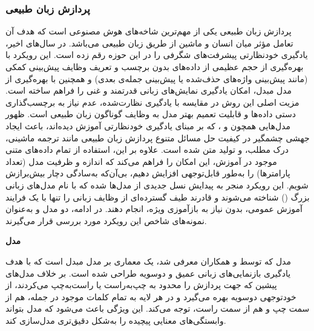 \subsubsection{پردازش زبان طبیعی}
پردازش زبان طبیعی یکی از مهم‌ترین شاخه‌های هوش مصنوعی است که هدف آن تعامل مؤثر میان انسان و ماشین از طریق زبان طبیعی می‌باشد. در سال‌های اخیر، یادگیری خودنظارتی پیشرفت‌های شگرفی را در این حوزه رقم زده است. این رویکرد با بهره‌گیری از حجم عظیمی از داده‌های بدون برچسب و تعریف وظایف پیش‌بینی کمکی (مانند پیش‌بینی واژه‌های حذف‌شده یا پیش‌بینی جمله‌ی بعدی) و همچنین با بهره‌گیری از مدل مبدل\cite{vaswani2017attention}، امکان یادگیری نمایش‌های زبانی قدرتمند و غنی را فراهم ساخته است. مزیت اصلی این روش در مقایسه با یادگیری نظارت‌شده، عدم نیاز به برچسب‌گذاری دستی داده‌ها و قابلیت تعمیم بهتر مدل به وظایف گوناگون زبان طبیعی است. ظهور مدل‌هایی همچون  و ، که بر مبنای یادگیری خودنظارتی آموزش دیده‌اند، باعث ایجاد جهشی چشمگیر در کیفیت حل مسائل متنوع پردازش زبان طبیعی مانند ترجمه ماشینی، درک مطلب، و تولید متن شده است. علاوه بر این، استفاده از تمام داده‌های متنی موجود در آموزش، این امکان را فراهم می‌کند که اندازه و ظرفیت مدل (تعداد پارامترها) را به‌طور قابل‌توجهی افزایش دهیم، بی‌آن‌که به‌سادگی دچار بیش‌برازش شویم. این رویکرد منجر به پیدایش نسل جدیدی از مدل‌ها شده که با نام مدل‌های زبانی بزرگ () شناخته می‌شوند و قادرند طیف گسترده‌ای از وظایف زبانی را تنها با یک فرایند آموزش عمومی، بدون نیاز به بازآموزی ویژه، انجام دهند. در ادامه، دو مدل  و  به‌عنوان نمونه‌های شاخص این رویکرد مورد بررسی قرار می‌گیرند.\newline

\noindent\textbf{مدل }

مدل  که توسط  و همکاران\cite{devlin2019bert} معرفی شد،
یک معماری بر مدل مبدل است که با هدف یادگیری بازنمایی‌های زبانی عمیق و دوسویه طراحی شده است. بر خلاف مدل‌های پیشین که جهت پردازش را محدود به چپ‌به‌راست یا راست‌به‌چپ می‌کردند،
از خودتوجهی دوسویه
بهره می‌گیرد و در هر لایه به تمام کلمات موجود در جمله، هم از سمت چپ و هم از سمت راست، توجه می‌کند. این ویژگی باعث می‌شود که مدل بتواند وابستگی‌های معنایی پیچیده را به‌شکل دقیق‌تری مدل‌سازی کند.

